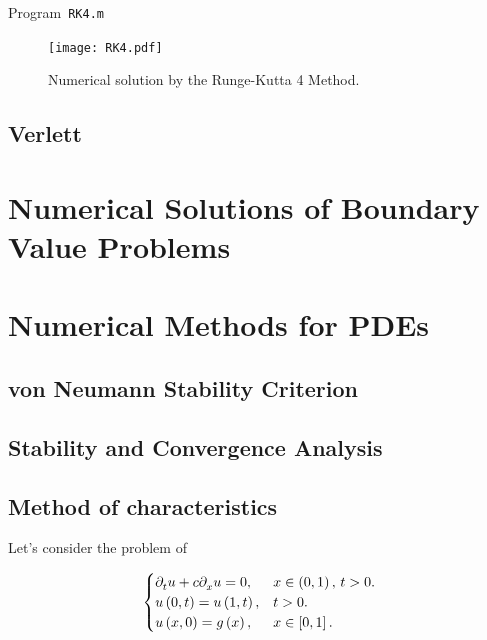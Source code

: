\begin{listing}[ht!]
	\tiny
	\centering
	\caption{Program~\texttt{RK4.m}}
	\label{code:RK2.m}
\end{listing}

\begin{figure}[ht!]
	\centering
	\texttt{[image: RK4.pdf]}
	\caption{Numerical solution by the Runge-Kutta 4 Method.}
\end{figure}

\section{Verlett}

\chapter{Numerical Solutions of Boundary Value Problems}

\chapter{Numerical Methods for PDEs}

\section{von Neumann Stability Criterion}

\section{Stability and Convergence Analysis}

\section{Method of characteristics}

\cite{Choksi2022,Arrigo2023}

Let's consider the problem of

\begin{equation*}
	\begin{cases}
		\difcp{u}{t}+
		c\difcp{u}{x}=0,   & x\in\left(0,1\right),\, t>0. \\
		u\left(0,t\right)=
		u\left(1,t\right), & t>0.                         \\
		u\left(x,0\right)=
		g\left(x\right),   & x\in\left[0,1\right].
	\end{cases}
\end{equation*}

